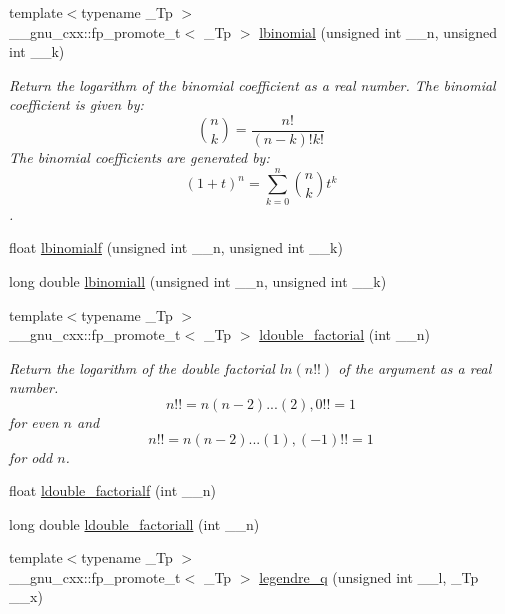 \begin{DoxyCompactItemize}
\item 
{\footnotesize template$<$typename \+\_\+\+Tp $>$ }\\\+\_\+\+\_\+gnu\+\_\+cxx\+::fp\+\_\+promote\+\_\+t$<$ \+\_\+\+Tp $>$ \hyperlink{group__gnu__math__spec__func_gabfa5aeba56edfa110846fc8e76963bc2}{lbinomial} (unsigned int \+\_\+\+\_\+n, unsigned int \+\_\+\+\_\+k)
\begin{DoxyCompactList}\small\item\em Return the logarithm of the binomial coefficient as a real number. The binomial coefficient is given by\+: \[ \binom{n}{k} = \frac{n!}{(n-k)! k!} \] The binomial coefficients are generated by\+: \[ \left(1 + t\right)^n = \sum_{k=0}^n \binom{n}{k} t^k \]. \end{DoxyCompactList}\item 
float \hyperlink{group__gnu__math__spec__func_ga2fe55bab4211fb240e1eb01341914129}{lbinomialf} (unsigned int \+\_\+\+\_\+n, unsigned int \+\_\+\+\_\+k)
\item 
long double \hyperlink{group__gnu__math__spec__func_ga20e6c250e10e20b9e2c3f68bf9a3d4c1}{lbinomiall} (unsigned int \+\_\+\+\_\+n, unsigned int \+\_\+\+\_\+k)
\item 
{\footnotesize template$<$typename \+\_\+\+Tp $>$ }\\\+\_\+\+\_\+gnu\+\_\+cxx\+::fp\+\_\+promote\+\_\+t$<$ \+\_\+\+Tp $>$ \hyperlink{group__gnu__math__spec__func_ga43bf9a20282d5b9237bf352682a48395}{ldouble\+\_\+factorial} (int \+\_\+\+\_\+n)
\begin{DoxyCompactList}\small\item\em Return the logarithm of the double factorial $ ln(n!!) $ of the argument as a real number. \[ n!! = n(n-2)...(2), 0!! = 1 \] for even $ n $ and \[ n!! = n(n-2)...(1), (-1)!! = 1 \] for odd $ n $. \end{DoxyCompactList}\item 
float \hyperlink{group__gnu__math__spec__func_ga33ecc59a7ff139b483cebf42ecd4fe79}{ldouble\+\_\+factorialf} (int \+\_\+\+\_\+n)
\item 
long double \hyperlink{group__gnu__math__spec__func_gae8fa4b4866cfd20349c985b33ed2936e}{ldouble\+\_\+factoriall} (int \+\_\+\+\_\+n)
\item 
{\footnotesize template$<$typename \+\_\+\+Tp $>$ }\\\+\_\+\+\_\+gnu\+\_\+cxx\+::fp\+\_\+promote\+\_\+t$<$ \+\_\+\+Tp $>$ \hyperlink{group__gnu__math__spec__func_gadad5b22d0075dca31690907668af568f}{legendre\+\_\+q} (unsigned int \+\_\+\+\_\+l, \+\_\+\+Tp \+\_\+\+\_\+x)

\end{DoxyCompactItemize}
